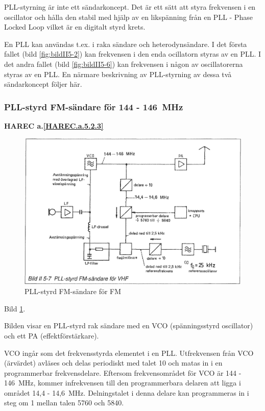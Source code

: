 PLL-styrning är inte ett sändarkoncept. Det är ett sätt att styra
frekvensen i en oscillator och hålla den stabil med hjälp av en
likspänning från en PLL - Phase Locked Loop vilket är en digitalt
styrd krets.

En PLL kan användas t.ex. i raka sändare och heterodynsändare. I det
första fallet (bild \ref{fig:bildII5-2}) kan frekvensen i den enda ocillatorn
styras av en PLL. I det andra fallet (bild \ref{fig:bildII5-6}) kan frekvensen i
någon av oscillatorerna styras av en PLL.  En närmare beskrivning av
PLL-styrning av dessa två sändarkoncept följer här.

\subsubsection{PLL-styrd FM-sändare för 144 - 146~MHz}
\textbf{
HAREC a.\ref{HAREC.a.5.2.3}\label{myHAREC.a.5.2.3}
}

\begin{figure}
  \includegraphics[width=\textwidth]{images/bild_2_5-07}
  \caption{PLL-styrd FM-sändare för FM}
  \label{fig:bildII5-7}
\end{figure}

Bild \ref{fig:bildII5-7}.

Bilden visar en PLL-styrd rak sändare med en VCO (spänningsstyrd
oscillator) och ett PA (effektförstärkare).

VCO ingår som det frekvensstyrda elementet i en PLL. Utfrekvensen från
VCO (ärvärdet) avläses och delas periodiskt med talet 10 och matas in
i en programmerbar frekvensdelare. Eftersom frekvensområdet för VCO är
144 - 146~MHz, kommer infrekvensen till den programmerbara delaren att
ligga i området 14,4 - 14,6~MHz. Delningstalet i denna delare kan
programmeras in i steg om 1 mellan talen 5760 och 5840.

